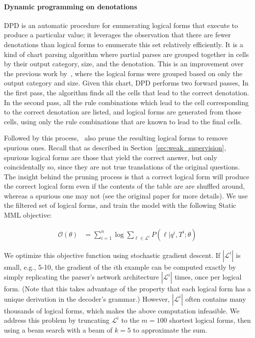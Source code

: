 \paragraph{Dynamic programming on denotations}
DPD is an automatic procedure for enumerating logical forms that execute to produce a particular value; it leverages the 
observation that there are fewer denotations than logical forms to enumerate 
this set relatively efficiently. It is a kind of chart parsing algorithm where
partial parses are grouped together in cells by their output category, size, and
the denotation. This is an improvement over the previous work by~\cite{pasupat2015compositional},
where the logical forms were grouped based on only the output category and size.
Given this chart, DPD performs two forward passes, In the first pass, the algorithm
finds all the cells that lead to the correct denotation. In the second pass, all the
rule combinations which lead to the cell corresponding to the correct denotation
are listed, and logical forms are generated from those cells, using only the rule combinations
that are known to lead to the final cells.

Followed by this
process,~\cite{pasupat2016inferring} also prune the resulting logical forms
to remove spurious ones. Recall that as described in
Section~\ref{sec:weak_supervision}, spurious logical forms are those that yield
the correct answer, but only coincidentally so, since they are not true
translations of the original questions. The insight behind the pruning process
is that a correct logical form will produce the correct logical form even if the
contents of the table are are shuffled around, whereas a spurious one may not
(see the original paper for more details). We use the filtered set of logical
forms, and train the model with the following Static MML objective: 

\begin{align}
    \mathcal{O}(\theta) & = \sum_{i=1}^n \log \sum_{\ell \in \mathcal{L}^i} 
P(\ell | q^i, T^i; \theta )
\end{align}

We optimize this objective function using stochastic gradient descent.
If $|\mathcal{L}^i|$ is small, e.g., 5-10, the gradient of the $i$th example 
can 
be computed exactly by simply replicating the parser's network architecture 
$|\mathcal{L}^i|$ times, once per logical form.
(Note that this takes advantage of the property that each logical form has a 
unique derivation in the decoder's grammar.)
However, $|\mathcal{L}^i|$ often contains many thousands of logical forms, 
which 
makes the above computation infeasible. We address this problem by truncating 
$\mathcal{L}^i$ to the $m=100$ shortest logical forms, then using a beam search 
with a beam of $k=5$ to approximate the sum.

